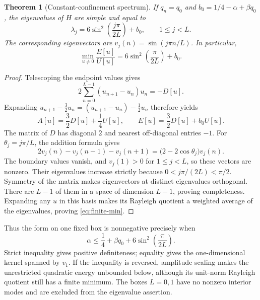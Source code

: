 \documentclass[11pt,letterpaper]{article}
\newtheorem{theorem}{Theorem}[section]
\theoremstyle{definition}
\numberwithin{equation}{section}
\begin{document}
\begin{theorem}[Constant-confinement spectrum]
If $q_n=q_0$ and $b_0=1/4-\alpha+\beta q_0$, the eigenvalues of $H$ are
simple and equal to
\begin{equation}
 \lambda_j=6\sin^2\left(\frac{j\pi}{2L}\right)+b_0,
 \qquad 1\le j<L.
 \label{eq:sine-spectrum}
\end{equation}
The corresponding eigenvectors are $v_j(n)=\sin(j\pi n/L)$. In
particular,
\begin{equation}
 \min_{u\ne0}\frac{E[u]}{U[u]}
 =6\sin^2\left(\frac{\pi}{2L}\right)+b_0.
 \label{eq:finite-min}
\end{equation}
\end{theorem}
\begin{proof}
Telescoping the endpoint values gives
\[
 2\sum_{n=0}^{L-1}(u_{n+1}-u_n)u_n=-D[u].
\]
Expanding $u_{n+1}-\tfrac32u_n=(u_{n+1}-u_n)-\tfrac12u_n$
therefore yields
\begin{equation}
 A[u]=\frac32D[u]+\frac14U[u],\qquad
 E[u]=\frac32D[u]+b_0U[u].
 \label{eq:hardy-identity}
\end{equation}
The matrix of $D$ has diagonal $2$ and nearest off-diagonal entries $-1$.
For $\theta_j=j\pi/L$, the addition formula gives
\[
 2v_j(n)-v_j(n-1)-v_j(n+1)
 =\bigl(2-2\cos\theta_j\bigr)v_j(n).
\]
The boundary values vanish, and $v_j(1)>0$ for $1\le j<L$, so these
vectors are nonzero. Their eigenvalues increase strictly because
$0<j\pi/(2L)<\pi/2$. Symmetry of the matrix makes eigenvectors at distinct
eigenvalues orthogonal. There are $L-1$ of them in a space of dimension
$L-1$, proving completeness. Expanding any $u$ in this basis makes its
Rayleigh quotient a weighted average of the eigenvalues, proving
\eqref{eq:finite-min}.
\end{proof}

Thus the form on one fixed box is nonnegative precisely when
\begin{equation}
 \alpha\le\frac14+\beta q_0+
             6\sin^2\left(\frac{\pi}{2L}\right).
 \label{eq:finite-wall}
\end{equation}
Strict inequality gives positive definiteness; equality gives the
one-dimensional kernel spanned by $v_1$. If the inequality is reversed,
amplitude scaling makes the unrestricted quadratic energy unbounded
below, although its unit-norm Rayleigh quotient still has a finite minimum.
The boxes $L=0,1$ have no nonzero interior modes and are excluded from the
eigenvalue assertion.
\end{document}
